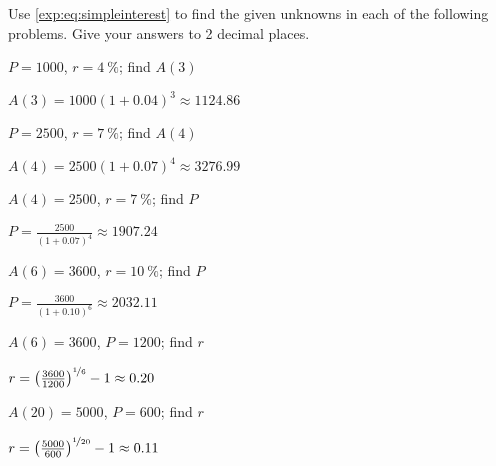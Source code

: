 \begin{exercises}
\begin{problem}
Use \cref{exp:eq:simpleinterest} to find the given unknowns 
in each of the following problems. Give your answers to 2 decimal places.
\begin{multicols}{2}
	\begin{subproblem}
		$P=1000$, $r=\SI{4}{\percent}$; find $A(3)$
		\begin{shortsolution}
			$A(3)=1000(1+0.04)^3\approx 1124.86$
		\end{shortsolution}
	\end{subproblem}
	\begin{subproblem}
		$P=2500$, $r=\SI{7}{\percent}$; find $A(4)$
		\begin{shortsolution}
			$A(4)=2500(1+0.07)^4\approx 3276.99$
		\end{shortsolution}
	\end{subproblem}
	\begin{subproblem}
		$A(4)=2500$, $r=\SI{7}{\percent}$; find $P$
		\begin{shortsolution}
			$P=\frac{2500}{(1+0.07)^4}\approx 1907.24$
		\end{shortsolution}
	\end{subproblem}
	\begin{subproblem}
		$A(6)=3600$, $r=\SI{10}{\percent}$; find $P$
		\begin{shortsolution}
			$P=\frac{3600}{(1+0.10)^6}\approx 2032.11$
		\end{shortsolution}
	\end{subproblem}
	\begin{subproblem}
		$A(6)=3600$, $P=1200$; find $r$
		\begin{shortsolution}
			$r= \left( \frac{3600}{1200} \right)^{\nicefrac{1}{6}}-1\approx 0.20$
		\end{shortsolution}
	\end{subproblem}
	\begin{subproblem}
		$A(20)=5000$, $P=600$; find $r$
		\begin{shortsolution}
			$r= \left( \frac{5000}{600} \right)^{\nicefrac{1}{20}}-1\approx 0.11$
		\end{shortsolution}
	\end{subproblem}
\end{multicols}
\end{problem}

\end{exercises}
